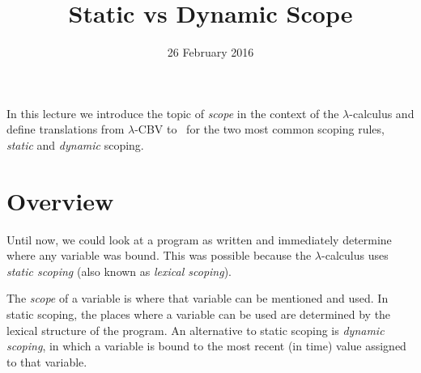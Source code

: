 \title{Static vs Dynamic Scope}
\date{26 February 2016}
\maketitle

In this lecture we introduce the topic of \emph{scope} in the context
of the $\lambda$-calculus and define translations from $\lambda$-CBV
to \FL\ for the two most common scoping rules, \emph{static}
and \emph{dynamic} scoping.

\section{Overview}

Until now, we could look at a program as written and immediately
determine where any variable was bound.  This was possible because the
$\lambda$-calculus uses \emph{static scoping} (also known
as \emph{lexical scoping}).

The \emph{scope} of a variable is where that variable can be mentioned
and used.  In static scoping, the places where a variable can be used
are determined by the lexical structure of the program.  An
alternative to static scoping is \emph{dynamic scoping}, in which a
variable is bound to the most recent (in time) value assigned to that
variable.

